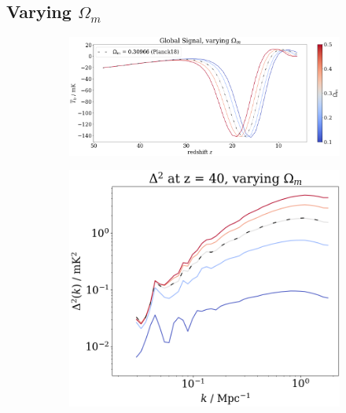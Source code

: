 \documentclass[floats,floatfix,showpacs,amssymb,prd,superscriptaddress,nofootinbib]{revtex4-2} %
\begin{document}
\subsection{Varying $\Omega_m$}

\begin{figure}[H]
     \centering
     \begin{subfigure}[b]{0.9\textwidth}
         \centering
         \includegraphics[width=\textwidth]{images/simulation_results/global_signal_Om.png}
         \label{fig:global_signal_Om}
     \end{subfigure}
     \hfill
     \begin{subfigure}[b]{0.45\textwidth}
         \centering
         \includegraphics[width=\textwidth]{images/simulation_results/power_spectrum_fixed_z_40_Om.png}
         \label{fig:power_spectrum_fixed_z_40_Om}
     \end{subfigure}
     \hfill
     \begin{subfigure}[b]{0.45\textwidth}

\end{subfigure}
\end{figure}
\end{document}
